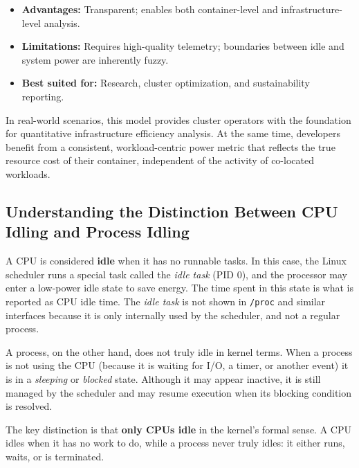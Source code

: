 \begin{itemize}
    \item \textbf{Advantages:} Transparent; enables both container-level and infrastructure-level analysis.
    \item \textbf{Limitations:} Requires high-quality telemetry; boundaries between idle and system power are inherently fuzzy.
    \item \textbf{Best suited for:} Research, cluster optimization, and sustainability reporting.
\end{itemize}

In real-world scenarios, this model provides cluster operators with the foundation for quantitative infrastructure efficiency analysis. At the same time, developers benefit from a consistent, workload-centric power metric that reflects the true resource cost of their container, independent of the activity of co-located workloads.

\subsection{Understanding the Distinction Between CPU Idling and Process Idling}
A CPU is considered \textbf{idle} when it has no runnable tasks. In this case, the Linux scheduler runs a special task called the \textit{idle task} (PID 0), and the processor may enter a low-power idle state to save energy. The time spent in this state is what is reported as CPU idle time. The \textit{idle task} is not shown in \texttt{/proc} and similar interfaces because it is only internally used by the scheduler, and not a regular process.

A process, on the other hand, does not truly idle in kernel terms. When a process is not using the CPU (because it is waiting for I/O, a timer, or another event) it is in a \textit{sleeping} or \textit{blocked} state. Although it may appear inactive, it is still managed by the scheduler and may resume execution when its blocking condition is resolved.

The key distinction is that \textbf{only CPUs idle} in the kernel’s formal sense. A CPU idles when it has no work to do, while a process never truly idles: it either runs, waits, or is terminated.



